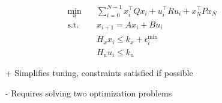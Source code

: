 \begin{align*}
    \min_u \quad      & \sum_{i=0}^{N-1} x_i^\top Q x_i + u_i^\top R u_i + x_N^\top P x_N \\
    \text{s.t.} \quad & x_{i+1} = A x_i + B u_i                                           \\
                      & H_x x_i \leq k_x + \epsilon_i^{\min}                              \\
                      & H_u u_i \leq k_u
\end{align*}

\newpar{}

\begin{itemize}
    \item [+] Simplifies tuning, constraints satisfied if possible
    \item [-] Requires solving two optimization problems
\end{itemize}
